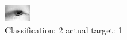 \begin{figure}[h!]
\begin{center}
\includegraphics[width=0.60\columnwidth]{figures/ID1424_class_2_target_1.png}
\end{center}
\caption{ Classification: 2 actual target: 1}
\label{fig:ID1424_class_2_target_1}
\end{figure}
